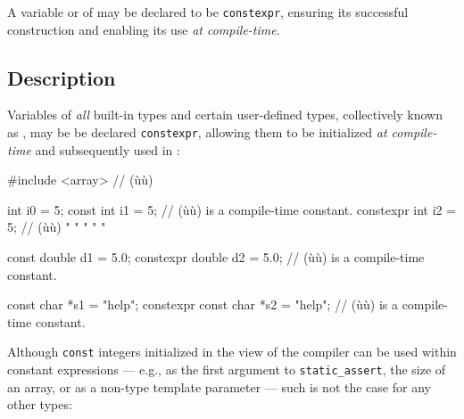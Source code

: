 

 

\setcounter{table}{0}
\setcounter{footnote}{0}
\setcounter{lstlisting}{0}

A variable or  of  may be
declared to be \lstinline!constexpr!, ensuring its successful construction
and enabling its use \emph{at compile-time}.

\subsection[Description]{Description}\label{description}

Variables of \emph{all} built-in types and certain user-defined types,
collectively known as , may be be declared
\lstinline!constexpr!, allowing them to be initialized \emph{at
compile-time} and subsequently used in :

\begin{emcppshiddenlisting}[emcppsbatch=e1]
#include <array>  // (ù{}ù)
\end{emcppshiddenlisting}
\begin{emcppslisting}[emcppsbatch=e1]
          int i0 = 5;
    const int i1 = 5;               // (ù{}ù) is a compile-time constant.
constexpr int i2 = 5;               // (ù{}ù)  " "    "      "     "

    const double d1 = 5.0;
constexpr double d2 = 5.0;          // (ù{}ù) is a compile-time constant.

          const char *s1 = "help";
constexpr const char *s2 = "help";  // (ù{}ù) is a compile-time constant.
\end{emcppslisting}

Although \lstinline!const! integers initialized in the view of the compiler
can be used within constant expressions --- e.g., as the first argument
to \lstinline!static_assert!, the size of an array, or as a non-type
template parameter --- such is not the case for any other types:

